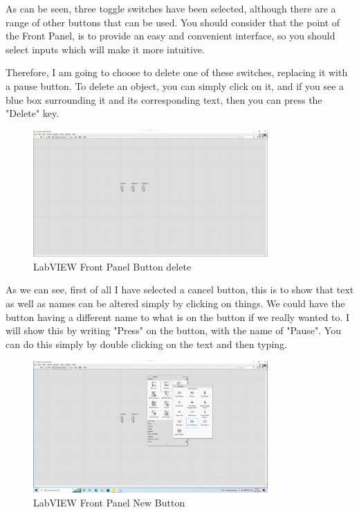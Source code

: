 \documentclass[a4paper,11pt]{report}
\begin{document}
As can be seen, three toggle switches have been selected, although there are a range of other buttons that can be used. You should consider that the point of the Front Panel, is to provide an easy and convenient interface, so you should select inputs which will make it more intuitive.

Therefore, I am going to choose to delete one of these switches, replacing it with a pause button. To delete an object, you can simply click on it, and if you see a blue box surrounding it and its corresponding text, then you can press the "Delete" key.

\begin{figure}[H]
\centering
\includegraphics[width=0.8\textwidth]{screenshots/labview12}
\caption{LabVIEW Front Panel Button delete}
\end{figure}

As we can see, first of all I have selected a cancel button, this is to show that text as well as names can be altered simply by clicking on things. We could have the button having a different name to what is on the button if we really wanted to. I will show this by writing "Press" on the button, with the name of "Pause". You can do this simply by double clicking on the text and then typing.

\begin{figure}[H]
\centering
\includegraphics[width=0.8\textwidth]{screenshots/labview13}
\caption{LabVIEW Front Panel New Button}
\end{figure}
\end{document}
